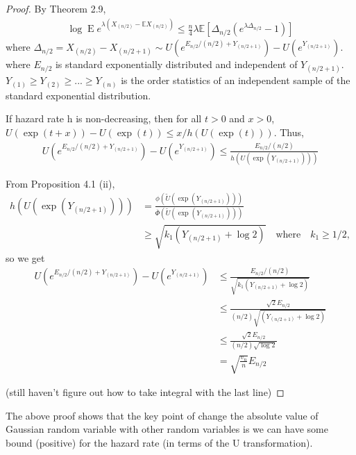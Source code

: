 \documentclass{article}
\theoremstyle{plain}
\begin{document}
\begin{proof}
By \cite{boucheron2012} Theorem 2.9, 
\begin{align}
    \log \operatorname{E} e^{\lambda\left(X_{(n / 2)}-\mathbb{E} X_{(n / 2)}\right)} \leq \frac{n}{4} \lambda \mathbb{E}\left[\Delta_{n / 2}\left(e^{\lambda \Delta_{n / 2}}-1\right)\right]
\end{align}
where $\Delta_{n / 2}=X_{(n / 2)}-X_{(n / 2+1)} \sim U\left(e^{E_{n / 2} /(n / 2)+Y_{(n / 2+1)}} \right)-U\left(e^{Y_{(n / 2+1)}}\right).$ where $E_{n/2}$ is standard exponentially distributed and independent of $Y_{(n/2 + 1)}$. $Y_{(1)} \geq Y_{(2)} \geq ... \geq Y_{(n)}$ is the order statistics of an independent sample of the standard exponential distribution. 

If hazard rate h is non-decreasing, then for all $t > 0$ and $x > 0$, $U(\exp (t+x))-U(\exp (t)) \leq x / h(U(\exp (t)))$. Thus, 
\begin{align}
    U\left(e^{E_{n / 2} /(n / 2)+Y_{(n / 2+1)}} \right)-U\left(e^{Y_{(n / 2+1)}}\right) \leq \frac{E_{n / 2} /(n / 2)}{h(U(\exp{(Y_{(n/2+1)})}))}
\end{align}

From \cite{boucheron2012} Proposition 4.1 (ii), 
\begin{align}
    h(U(\exp{(Y_{(n/2+1)})})) &= \frac{\phi(\widetilde{U}(\exp (Y_{(n/2+1)})))}{\overline{\Phi}(\widetilde{U}(\exp (Y_{(n/2+1)})))}\\
    &\geq \sqrt{k_1 (Y_{(n/2+1)} + \log 2)} \quad \text{where} \quad k_1 \geq 1/2,
\end{align}
so we get 
\begin{align}
    U\left(e^{E_{n / 2} /(n / 2)+Y_{(n / 2+1)}} \right)-U\left(e^{Y_{(n / 2+1)}}\right) &\leq \frac{E_{n / 2} /(n / 2)}{\sqrt{k_1 (Y_{(n/2+1)} + \log 2)}}\\
    &\leq \frac{ \sqrt{2} E_{n / 2} }{(n / 2)\sqrt{(Y_{(n/2+1)} + \log 2)}}\\
    &\leq \frac{ \sqrt{2} E_{n / 2} }{(n / 2)\sqrt{ \log 2}}\\
    &= \sqrt{\frac{v_{n}}{n}} E_{n / 2}
\end{align}

(still haven't figure out how to take integral with the last line)
\end{proof}

The above proof shows that the key point of change the absolute value of Gaussian random variable with other random variables is we can have some bound (positive) for the hazard rate (in terms of the U transformation). 
\end{document}

